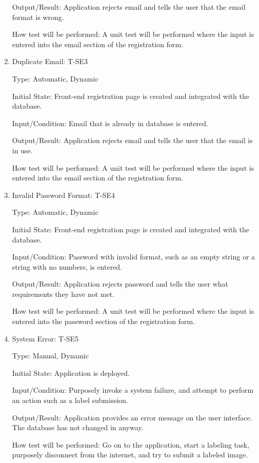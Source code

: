 \documentclass[12pt, titlepage]{article}
\begin{document}
\begin{enumerate}
Output/Result: Application rejects email and tells the user that the email format is wrong.
					
How test will be performed: A unit test will be performed where the input is entered into the email section of the registration form.

\item{Duplicate Email: T-SE3\\}

Type: Automatic, Dynamic
					
Initial State: Front-end registration page is created and integrated with the database.
					
Input/Condition: Email that is already in database is entered.
					
Output/Result: Application rejects email and tells the user that the email is in use.
					
How test will be performed: A unit test will be performed where the input is entered into the email section of the registration form.

\item{Invalid Password Format: T-SE4\\}

Type: Automatic, Dynamic
					
Initial State: Front-end registration page is created and integrated with the database.
					
Input/Condition: Password with invalid format, such as an empty string or a string with no numbers, is entered.
					
Output/Result: Application rejects password and tells the user what requirements they have not met.
					
How test will be performed: A unit test will be performed where the input is entered into the password section of the registration form.

\item{System Error: T-SE5\\}

Type: Manual, Dynamic
					
Initial State: Application is deployed.
					
Input/Condition: Purposely invoke a system failure, and attempt to perform an action such as a label submission.
					
Output/Result: Application provides an error message on the user interface. The database has not changed in anyway.
					
How test will be performed: Go on to the application, start a labeling task, purposely disconnect from the internet, and try to submit a labeled image.

\end{enumerate}
\end{document}
